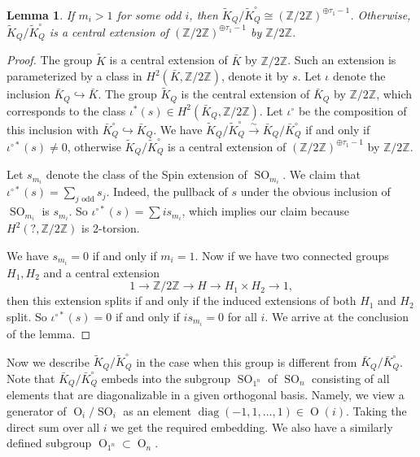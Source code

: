 \documentclass[12pt]{amsart}
\newcommand{\Z}{\mathbb{Z}}
\newtheorem{Lem}[Thm]{Lemma}
\theoremstyle{definition}
\numberwithin{equation}{section}
\begin{document}
\begin{Lem}\label{Lem:comp_group_Spin1}
If $m_i>1$ for some odd $i$, then $\tilde{K}_Q/\tilde{K}_Q^\circ\cong (\Z/2\Z)^{\oplus \tau_1-1}$.
Otherwise, $\tilde{K}_Q/\tilde{K}_Q^\circ$ is a central extension of $(\Z/2\Z)^{\oplus \tau_1-1}$
by $\Z/2\Z$.
\end{Lem}
\begin{proof}
The group $\tilde{K}$ is a central extension of $\bar{K}$ by $\Z/2\Z$. Such an extension is parameterized by a class in $H^2(\bar{K},\Z/2\Z)$,
denote it by $s$. Let $\iota$ denote the inclusion $\bar{K}_Q\hookrightarrow \bar{K}$.
The group $\tilde{K}_Q$ is the central extension of $\bar{K}_Q$ by $\Z/2\Z$, which corresponds
to the class $\iota^*(s)\in H^2(\bar{K}_Q,\Z/2\Z)$. Let $\iota^\circ$ be the composition
of this inclusion with $\bar{K}_Q^\circ\hookrightarrow \bar{K}_Q$. We have
$\tilde{K}_Q/\tilde{K}_Q^\circ\xrightarrow{\sim} \bar{K}_Q/\bar{K}_Q^\circ$ if and only if
$\iota^{\circ*}(s)\neq 0$, otherwise $\tilde{K}_Q/\tilde{K}_Q^\circ$ is a central extension of $(\Z/2\Z)^{\oplus \tau_1-1}$
by $\Z/2\Z$.

Let $s_{m_i}$ denote the class of  the Spin extension of $\operatorname{SO}_{m_i}$. We claim
that $\iota^{\circ*}(s)=\sum_{j \text{ odd}} s_j$. Indeed, the pullback of $s$ under the
obvious inclusion of $\operatorname{SO}_{m_i}$ is $s_{m_i}$. So $\iota^{\circ*}(s)=\sum is_{m_i}$,
which implies our claim because $H^2(?,\Z/2\Z)$ is 2-torsion.

We have $s_{m_i}=0$ if and only if $m_i=1$.
 Now if we have
two connected groups $H_1,H_2$ and a central extension
$$1\rightarrow \Z/2\Z\rightarrow H\rightarrow H_1\times H_2\rightarrow 1,$$
then this extension splits if and only if the induced extensions of both $H_1$ and $H_2$
split. So $\iota^{\circ*}(s)=0$ if and only if
$is_{m_i}=0$ for all $i$. We arrive at the conclusion of the lemma.
\end{proof}

Now we describe $\tilde{K}_Q/\tilde{K}_Q^\circ$ in the case when this group is different from
$\bar{K}_Q/\bar{K}_Q^\circ$. Note that $\bar{K}_Q/\bar{K}_Q^\circ$ embeds
into the subgroup $\operatorname{SO}_{1^n}$ of $\operatorname{SO}_n$ consisting
of all elements that are diagonalizable in a given orthogonal basis. Namely,
we view a generator of $\operatorname{O}_i/\operatorname{SO}_i$ as an
element $\operatorname{diag}(-1,1,\ldots,1)\in \operatorname{O}(i)$. Taking the direct
sum over all $i$ we get the required embedding.
We also have a similarly defined subgroup $\operatorname{O}_{1^n}\subset \operatorname{O}_n$.
\end{document}
